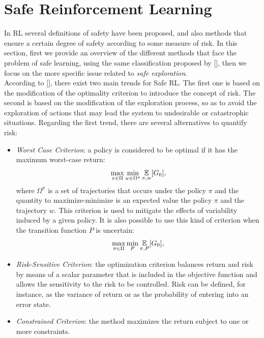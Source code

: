 \section{Safe Reinforcement Learning}\label{sec:saferl}
In \ac{RL} several definitions of safety have been proposed, and also methods that ensure a certain degree of safety according to some measure of risk. In this section, first we provide an overview of the different methods that face the problem of safe learning, using the same classification proposed by [\citeauthor{JMLR:v16:garcia15a}], then we focus on the more specific issue related to \emph{safe exploration}.\\
\newline
According to [\cite{JMLR:v16:garcia15a}], there exist two main trends for Safe \ac{RL}. The first one is based on the modification of the optimality criterion to introduce the concept of risk. The second is based on the modification of the exploration process, so as to avoid the exploration of actions that may lead the system to undesirable or catastrophic situations. Regarding the first trend, there are several alternatives to quantify risk:
\begin{itemize}
	\item \emph{Worst Case Criterion}: a policy is considered to be optimal if it has the maximum worst-case return:
	\begin{align}
	\max_{\pi \in \Pi}\min_{w \in \Omega^{\pi}} \operatorname*{\mathbb{E}}_{\pi, w}[G_{0}],
	\end{align}
	where $\Omega^{\pi}$ is a set of trajectories that occurs under the policy $\pi$ and the quantity to maximize-minimize is an expected value \wrt the policy $\pi$ and the trajectory $w$.	This criterion is used to mitigate the effects of variability induced by a given policy. It is also possible to use this kind of criterion when the transition function $P$ is uncertain:
	\begin{align}
	\max_{\pi \in \Pi}\min_{P} \operatorname*{\mathbb{E}}_{\pi, P}[G_{0}],
	\end{align}
	\item \emph{Risk-Sensitive Criterion}: the optimization criterion balances return and risk by means of a scalar parameter that is included in the objective function and allows the sensitivity to the risk to be controlled. Risk can be defined, for instance, as the variance of return or as the probability of entering into an error state.
	\item \emph{Constrained Criterion}: the method maximizes the return subject to one or more constraints.
\end{itemize}
